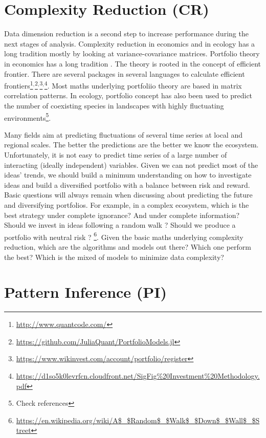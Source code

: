 \documentclass[english,12pt]{article}
\begin{document}
\section{Complexity Reduction (CR)}

Data dimension reduction is a second step to increase performance during the next stages of analysis. 
Complexity reduction in economics and in ecology has a long tradition mostly by looking at variance-covariance matrices.
Portfolio theory in economics has a long tradition \citep{MarkowitzBook}. The theory is rooted in the concept of
efficient frontier. There are several packages in several languages to
calculate efficient frontiers\footnote{\url{http://www.quantcode.com/}}$^{,}$\footnote{\url{https://github.com/JuliaQuant/PortfolioModels.jl}}$^{,}$\footnote{\url{https://www.wikinvest.com/account/portfolio/register}}$^{,}$\footnote{\url{https://d1so5k0levrfcn.cloudfront.net/SigFig\%20Investment\%20Methodology.pdf}}. Most maths underlying portfoliio theory are
based in matrix correlation patterns. In ecology, portfolio concept has also been used to predict the number of coexisting species in landscapes with highly fluctuating environments\footnote{Check references}.

Many fields aim at predicting fluctuations of several time series at local and regional scales. The better the predictions are the better we know the ecosystem. Unfortunately,
  it is not easy to predict time series of a large number of
  interacting (ideally independent) variables. Given we can not predict most of the
  ideas' trends, we should build a minimum understanding on how to
  investigate ideas and build a diversified portfolio with a balance
  between risk and reward. Basic questions will always remain when
  discussing about predicting the future and diversifying
  portfolios. For example, in a complex ecosystem, which is the best
  strategy under complete ignorance? And under complete information?
  Should we invest in ideas following a random walk ? Should
  we produce a portfolio with neutral risk ?
  \footnote{\url{https://en.wikipedia.org/wiki/A$_$Random$_$Walk$_$Down$_$Wall$_$Street}}. Given the basic maths underlying complexity reduction, which are the
algorithms and models out there? Which one perform the best? Which is
the mixed of models to minimize data complexity?
\\

\section{Pattern Inference (PI)}
\end{document}
